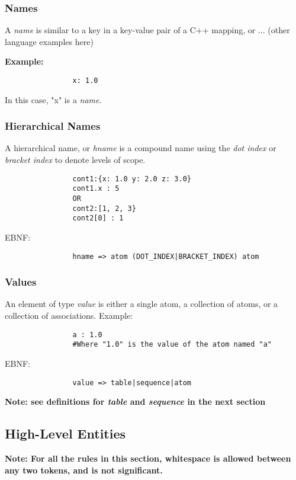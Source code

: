 \documentclass{article}
\begin{document}
		\subsubsection{Names}
			A \emph{name} is similar to a key in a key-value pair of a C++ mapping, or ... (other language examples here)
			\vspace{1mm}
			\par\bf{Example:}
			\rm
			\begin{verbatim}
				x: 1.0
			\end{verbatim}
			\vspace{1mm}
			In this case, 
			"x" is a \emph{name}.
		\subsubsection{Hierarchical Names}
			A hierarchical name,
			or \emph{hname} is a compound name 
			using the \emph{dot index}
			or \emph{bracket index}
			to denote levels of scope.
			\begin{verbatim}
				cont1:{x: 1.0 y: 2.0 z: 3.0}
				cont1.x : 5
				OR
				cont2:[1, 2, 3}
				cont2[0] : 1
			\end{verbatim}
			\vspace{1mm}
			\par
			EBNF:
			\begin{verbatim}
				hname => atom (DOT_INDEX|BRACKET_INDEX) atom
			\end{verbatim}
	
		\subsubsection{Values}
			An element of type \emph{value} is either a single atom, 
			a collection of atoms,
			or a collection of associations.
			Example:
			\begin{verbatim}
				a : 1.0
				#Where "1.0" is the value of the atom named "a"
			\end{verbatim}
			
			\vspace{1mm}
			\par
			EBNF:
			\begin{verbatim}
				value => table|sequence|atom
			\end{verbatim}	
			\vspace{1mm}
			\par
			\bf Note: \rm see definitions for \emph{table} 
			and \emph{sequence} 
			in the next section
	\subsection{High-Level Entities}
		\bf Note: \rm For all the rules in this section,
		whitespace is allowed between any two tokens,
		and is not significant.
						
\end{document}
